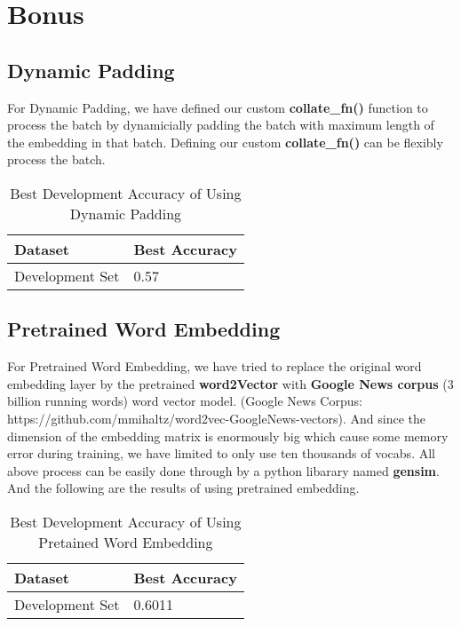 \documentclass{article}
\begin{document}
\section{Bonus}

\subsection{Dynamic Padding}
For Dynamic Padding, we have defined our custom \textbf{collate\_fn()} function to process the batch by dynamicially padding the batch with maximum length of the embedding in that batch. Defining our custom \textbf{collate\_fn()} can be flexibly process the batch.

\begin{table}[htb]
	\caption{Best Development Accuracy of Using Dynamic Padding}
	\label{sample-table}
	\centering
	\begin{tabular}{ll}
		\toprule
		\cmidrule{1-2}
		Dataset & Best Accuracy\\
		\midrule
		Development Set & 0.57  \\
		\bottomrule
	\end{tabular}
\end{table}


\subsection{Pretrained Word Embedding}
For Pretrained Word Embedding, we have tried to replace the original word embedding layer by the pretrained \textbf{word2Vector} with \textbf{Google News corpus} (3 billion running words) word vector model. (Google News Corpus: https://github.com/mmihaltz/word2vec-GoogleNews-vectors). And since the dimension of the embedding matrix is enormously big which cause some memory error during training, we have limited to only use ten thousands of vocabs. All above process can be easily done through by a python libarary named \textbf{gensim}. And the following are the results of using pretrained embedding.

\begin{table}[htb]
	\caption{Best Development Accuracy of Using Pretained Word Embedding}
	\label{sample-table}
	\centering
	\begin{tabular}{ll}
		\toprule
		\cmidrule{1-2}
		Dataset & Best Accuracy\\
		\midrule
		Development Set & 0.6011  \\
		\bottomrule
	\end{tabular}
\end{table}
\end{document}
